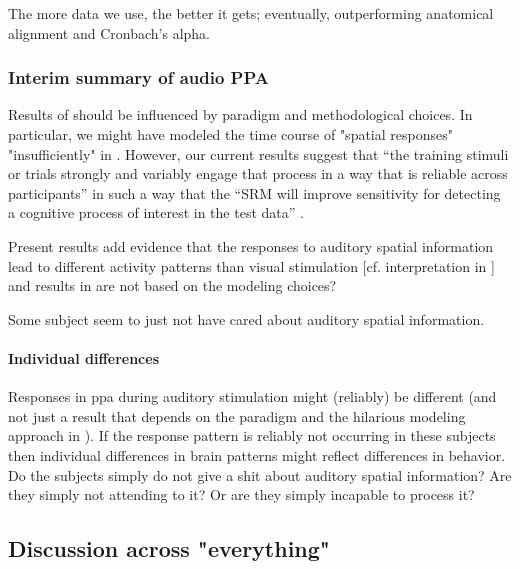 
The more data we use, the better it gets; eventually, outperforming anatomical
alignment and Cronbach's alpha.


\subsubsection{Interim summary of audio PPA}



%
Results of \citet{haeusler2022processing} should be influenced by paradigm and
methodological choices.
%
In particular, we might have modeled the time course of "spatial responses"
"insufficiently" in \citet{haeusler2022processing}.
%
However, our current results suggest that ``the training stimuli or trials
strongly and variably engage that process in a way that is reliable across
participants'' in such a way that the ``SRM will improve sensitivity for
detecting a cognitive process of interest in the test data''
\citep{cohen2017computational}.

%
Present results add evidence that the responses to auditory spatial information
lead to different activity patterns than visual stimulation [cf. interpretation
in \citet{haeusler2022processing}] and results in \citet{haeusler2022processing}
are not based on the modeling choices?

%
Some subject seem to just not have cared about auditory spatial information.


\paragraph{Individual differences}

%
Responses in \ac{ppa} during auditory stimulation might (reliably) be
different (and not just a result that depends on the paradigm and the hilarious
modeling approach in \citet{haeusler2022processing}).
%
If the response pattern is reliably not occurring in these subjects then
individual differences in brain patterns might reflect differences in behavior.
%
Do the subjects simply do not give a shit about auditory spatial information?
%
Are they simply not attending to it? Or are they simply incapable to process it?




\subsection{Discussion across "everything"}

